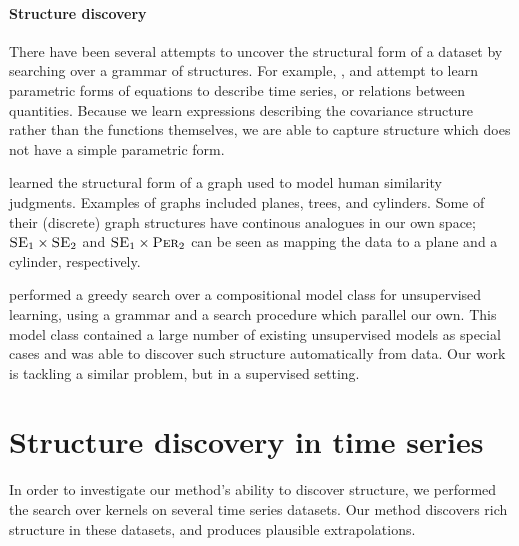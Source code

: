 \documentclass[twoside]{article}
\begin{document}
\paragraph{Structure discovery}

There have been several attempts to uncover the structural form of a dataset by searching over a grammar of structures. For example, \cite{schmidt2009distilling}, \cite{todorovski1997declarative} and \cite{washio1999discovering} attempt to learn parametric forms of equations to describe time series, or relations between quantities. Because we learn expressions describing the covariance structure rather than the functions themselves, we are able to capture structure which does not have a simple parametric form.

\citet{kemp2008discovery} learned the structural form of a graph used to model human similarity judgments.
Examples of graphs included planes, trees, and cylinders.
Some of their (discrete) graph structures have continous analogues in our own space; \eg $\textsc{SE}_1 \times \textsc{SE}_2$ and $\textsc{SE}_1 \times \textsc{Per}_2$ can be seen as mapping the data to a plane and a cylinder, respectively.

\citet{grosse2012exploiting} performed a greedy search over a compositional model class for unsupervised learning, using a grammar and a search procedure which parallel our own. This model class contained a large number of existing unsupervised models as special cases and was able to discover such structure automatically from data. Our work is tackling a similar problem, but in a supervised setting.







\section{Structure discovery in time series}
\label{sec:time_series}


In order to investigate our method's ability to discover structure, we performed the search over kernels on several time series datasets.
Our method discovers rich structure in these datasets, and produces plausible extrapolations.  
\end{document}
